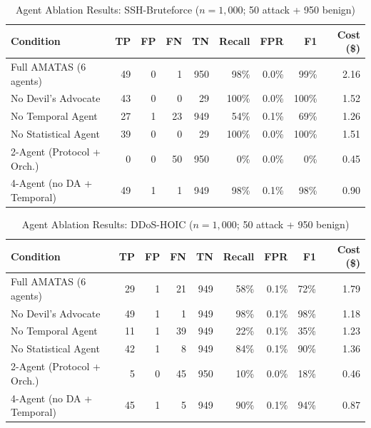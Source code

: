 \documentclass[../main.tex]{subfiles}
\begin{document}
\begin{table}[H]
\centering
\caption{Agent Ablation Results: SSH-Bruteforce ($n = 1{,}000$; 50 attack + 950 benign)}
\label{tab:ablation-ssh}
\small
\begin{tabular}{@{}l r r r r r r r r@{}}
\toprule
Condition & TP & FP & FN & TN & Recall & FPR & F1 & Cost (\$) \\
\midrule
Full AMATAS (6 agents) & 49 & 0 & 1 & 950 & 98\% & 0.0\% & 99\% & 2.16 \\
No Devil's Advocate & 43 & 0 & 0 & 29 & 100\% & 0.0\% & 100\% & 1.52 \\
No Temporal Agent & 27 & 1 & 23 & 949 & 54\% & 0.1\% & 69\% & 1.26 \\
No Statistical Agent & 39 & 0 & 0 & 29 & 100\% & 0.0\% & 100\% & 1.51 \\
2-Agent (Protocol + Orch.) & 0 & 0 & 50 & 950 & 0\% & 0.0\% & 0\% & 0.45 \\
4-Agent (no DA + Temporal) & 49 & 1 & 1 & 949 & 98\% & 0.1\% & 98\% & 0.90 \\
\bottomrule
\end{tabular}
\end{table}

\begin{table}[H]
\centering
\caption{Agent Ablation Results: DDoS-HOIC ($n = 1{,}000$; 50 attack + 950 benign)}
\label{tab:ablation-hoic}
\small
\begin{tabular}{@{}l r r r r r r r r@{}}
\toprule
Condition & TP & FP & FN & TN & Recall & FPR & F1 & Cost (\$) \\
\midrule
Full AMATAS (6 agents) & 29 & 1 & 21 & 949 & 58\% & 0.1\% & 72\% & 1.79 \\
No Devil's Advocate & 49 & 1 & 1 & 949 & 98\% & 0.1\% & 98\% & 1.18 \\
No Temporal Agent & 11 & 1 & 39 & 949 & 22\% & 0.1\% & 35\% & 1.23 \\
No Statistical Agent & 42 & 1 & 8 & 949 & 84\% & 0.1\% & 90\% & 1.36 \\
2-Agent (Protocol + Orch.) & 5 & 0 & 45 & 950 & 10\% & 0.0\% & 18\% & 0.46 \\
4-Agent (no DA + Temporal) & 45 & 1 & 5 & 949 & 90\% & 0.1\% & 94\% & 0.87 \\
\bottomrule
\end{tabular}
\end{table}
\end{document}
